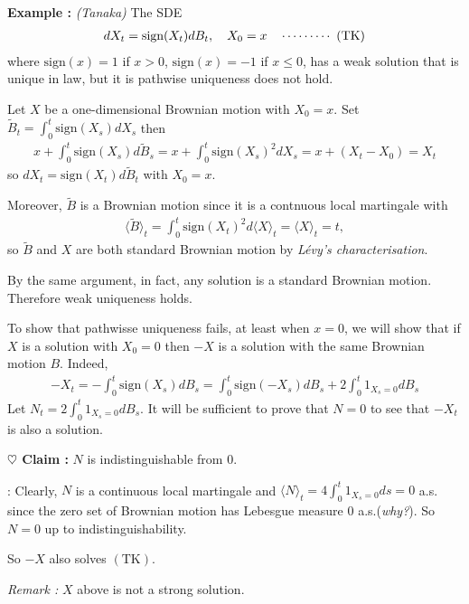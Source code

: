 \documentclass[12pt,a4paper]{article}
\newenvironment{proof}
{\begin{changemargin}{0.5cm}{0.5cm} 
	}%
	{\end{changemargin}
}
\newenvironment{subproof}
{\begin{changemargin}{0.5cm}{0.5cm} 
	}%
	{\end{changemargin}
}
\newenvironment{p}
{\begin{proof} 
	}%
	{\end{proof}
}
\begin{document}
\textbf{Example :} \emph{(Tanaka)} The SDE
\begin{align*}
dX_t = \text{sign}(X_t) dB_t, \quad X_0=x \quad \cdots\cdots\cdots\,\,(\text{TK})
\end{align*}
where $\text{sign}(x) = 1$ if $x>0$, $\text{sign}(x) =-1$ if $x\leq 0$, has a weak solution that is unique in law, but it is pathwise uniqueness does not hold. 
\begin{p}
\pf Let $X$ be a one-dimensional Brownian motion with $X_0 =x$. Set $\tilde{B}_t = \int_0^t \text{sign}(X_s) dX_s$ then
\begin{align*}
x+ \int_0^t \text{sign}(X_s) d\tilde{B}_s = x+ \int_0^t \text{sign}(X_s)^2 dX_s = x + (X_t - X_0) =X_t
\end{align*}
so $dX_t = \text{sign}(X_t) d\tilde{B}_t$ with $X_0 =x$.

\quad Moreover, $\tilde{B}$ is a Brownian motion since it is a contnuous local martingale with
\begin{align*}
\langle \tilde{B} \rangle_t = \int_0^t \text{sign}(X_t)^2 d\langle X\rangle_t  = \langle X\rangle_t =t,
\end{align*} 
so $\tilde{B}$ and $X$ are both standard Brownian motion by \emph{L\'evy's characterisation}.

\quad By the same argument, in fact, any solution is a standard Brownian motion. Therefore weak uniqueness holds.
\s

To show that pathwisse uniqueness fails, at least when $x=0$, we will show that if $X$ is a solution with $X_0 =0$ then $-X$ is a solution with the same Brownian motion $B$. Indeed,
\begin{align*}
-X_t = -\int_0^t \text{sign}(X_s) dB_s = \int_0^t \text{sign}(-X_s) dB_s + 2\int_0^t 1_{X_s =0} dB_s
\end{align*}
Let $N_t = 2\int_0^t 1_{X_s =0} dB_s$. It will be sufficient to prove that $N =0$ to see that $-X_t$ is also a solution.

\textbf{$\heartsuit$ Claim :} $N$ is indistinguishable from 0.
\begin{subproof}
: Clearly, $N$ is a continuous local martingale and $\langle N \rangle_t = 4\int_0^t 1_{X_s =0} ds=0$ a.s. since the zero set of Brownian motion has Lebesgue measure 0 a.s.(\emph{why?}). So $N=0$ up to indistinguishability.
\end{subproof}
So $-X$ also solves $(\text{TK})$.

\eop
\end{p}
\s

\emph{Remark :} $X$ above is not a strong solution.
\s
\end{document}
